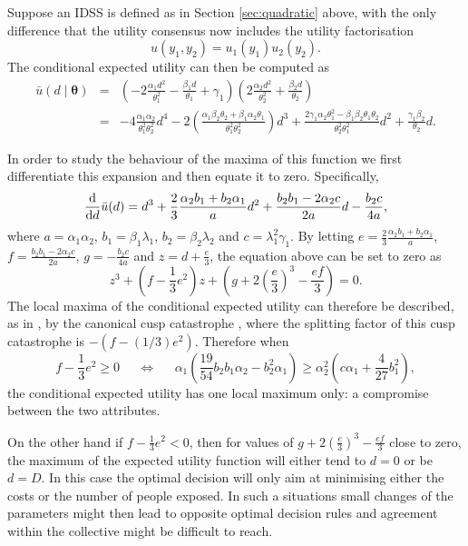 Suppose an IDSS is defined as in Section \ref{sec:quadratic} above, with the only difference that the utility consensus now includes the utility factorisation
\begin{equation*}
u(y_1,y_2)=u_1(y_1)u_2(y_2).
\end{equation*}  
The conditional expected utility can then be computed as
\begin{eqnarray*}
\bar{u}(d\;|\;\bm{\theta})&=& \left(-2\frac{\alpha_1d^2}{\theta_1^2}-\frac{\beta_1d}{\theta_1}+\gamma_1\right)\left(2\frac{\alpha_2d^2}{\theta_2^2}+\frac{\beta_2d}{\theta_2}\right) \\
&=&-4\frac{\alpha_1\alpha_2}{\theta_1^2\theta_2^2}d^4-2\left(\frac{\alpha_1\beta_2\theta_2+\beta_1\alpha_2\theta_1}{\theta_1^2\theta_2^2}\right)d^3+\frac{2\gamma_1\alpha_2\theta_1^2-\beta_1\beta_2\theta_1\theta_2}{\theta_2^2\theta_1^2}d^2+\frac{\gamma_1\beta_2}{\theta_2}d.
\end{eqnarray*}

In order to study the behaviour of the maxima of this function we first differentiate this expansion and then equate it to zero. Specifically,
\begin{equation*}
\frac{\textnormal{d}}{\textnormal{d} d}\bar{u}(d)=d^3+\frac{2}{3}\frac{\alpha_2b_1+b_2\alpha_1}{a}d^2+\frac{b_2b_1-2\alpha_2c}{2a}d-\frac{b_2c}{4a},
\end{equation*}
where $a=\alpha_1\alpha_2$, $b_1=\beta_1\lambda_1$, $b_2=\beta_2\lambda_2$ and $c=\lambda_1^2\gamma_1$. By letting $e=\frac{2}{3}\frac{\alpha_2b_1+b_2\alpha_1}{a}$, $f=\frac{b_2b_1-2\alpha_2c}{2a}$, $g=-\frac{b_2c}{4a}$ and $z=d+\frac{e}{3}$, the equation above can be set to zero as
\begin{equation*}
z^3+\left(f-\frac{1}{3}e^2\right)z +\left(g+2\left(\frac{e}{3}\right)^3-\frac{ef}{3}\right)=0.
\end{equation*}
The local maxima of the conditional expected utility can therefore be described, as in \citet{Smith2012}, by the canonical cusp catastrophe \citep{Zeeman1979}, where the splitting factor of this cusp catastrophe is $-(f-(1/3)e^2)$. Therefore when 
\begin{equation*}
f-\frac{1}{3}e^2\geq 0 \;\;\;\;\; \Longleftrightarrow \;\;\;\;\; \alpha_1\left(\frac{19}{54}b_2b_1\alpha_2-b_2^2\alpha_1\right)\geq \alpha_2^2\left(c\alpha_1+\frac{4}{27}b_1^2\right),
\end{equation*}
the conditional expected utility has one local maximum only: a compromise between the two attributes. 

On the other hand if $f-\frac{1}{3}e^2< 0$, then for values of $g+2\left(\frac{e}{3}\right)^3-\frac{ef}{3}$ close to zero, the maximum of the expected utility function will either tend to $d=0$ or be $d=D$. In this case the optimal decision will only aim at minimising either the costs or the number of people exposed. In such a situations small changes of the parameters might then lead to opposite optimal decision rules and agreement within the collective might be difficult to reach. 

